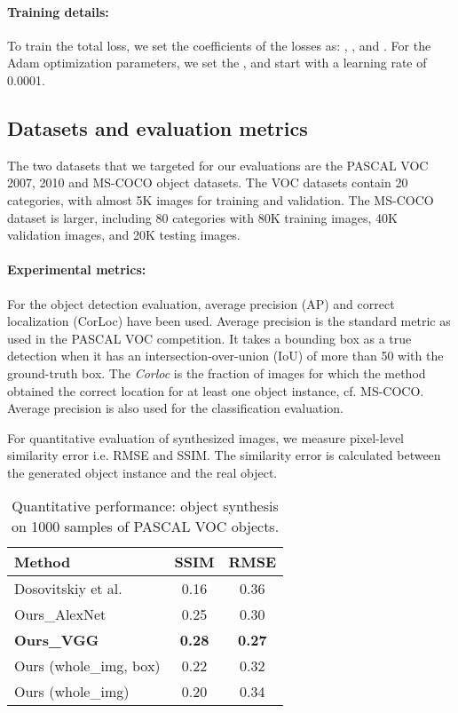 \documentclass[runningheads]{llncs}
\begin{document}
\paragraph*{Training details:} To train the total loss, we set the coefficients of the losses as: ,  ,  and . For the Adam optimization parameters, we set the ,  and start with a learning rate of 0.0001.

\subsection{Datasets and evaluation metrics}

The two datasets that we targeted for our evaluations are the PASCAL VOC 2007, 2010 and MS-COCO object datasets. The VOC datasets contain 20 categories, with almost 5K images for training and validation. The MS-COCO dataset is larger, including 80 categories with 80K training images, 40K validation images, and 20K testing images.
\paragraph*{Experimental metrics:} For the object detection evaluation, average precision (AP) and correct localization (CorLoc) have been used. Average precision is the standard metric as used in the PASCAL VOC competition. It takes a bounding box as a true detection when it has an intersection-over-union (IoU) of more than 50 with the ground-truth box. The \textit{Corloc} is the fraction of images for which the method obtained the correct location for at least one object instance, cf. MS-COCO. Average precision is also used for the classification evaluation.

For quantitative evaluation of synthesized images, we measure pixel-level similarity error i.e. RMSE and SSIM. The similarity error is calculated between the generated object instance and the real object.


\begin{table}[htb]
{\small
\tabcolsep=0.3cm
\caption{Quantitative performance: object synthesis on 1000 samples of PASCAL VOC objects.}
\label{tab:1}
\begin{center}
\begin{tabular}{lcc}
\toprule 
Method & SSIM & RMSE \\
\midrule
Dosovitskiy et al.~\cite{dosovitskiy2} & 0.16& 0.36 \\
Ours\_AlexNet & 0.25 & 0.30   \\
\textbf{Ours\_VGG} & \textbf{0.28} & \textbf{0.27}   \\
\midrule
Ours (whole\_img, box) & 0.22 & 0.32   \\
Ours (whole\_img) & 0.20 & 0.34   \\
\bottomrule
\end{tabular}
\end{center}}
\vspace{-1cm}
 
\end{table}
\end{document}
